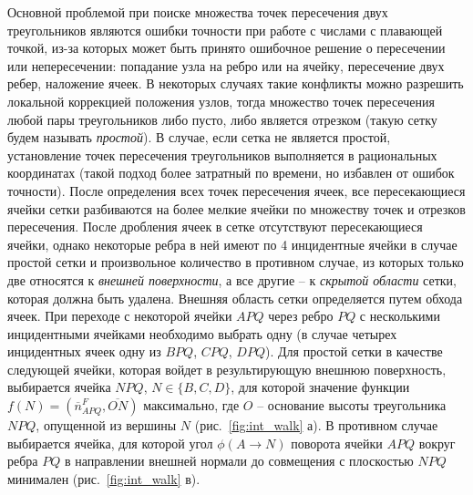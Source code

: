 \documentclass[a4paper,14pt]{extarticle}                     %
\theoremstyle{plain}                                         %
\begin{document}
Основной проблемой при поиске множества точек пересечения двух треугольников являются ошибки точности при работе с числами с плавающей точкой, из-за которых может быть принято ошибочное решение о пересечении или непересечении: попадание узла на ребро или на ячейку, пересечение двух ребер, наложение ячеек.
В некоторых случаях такие конфликты можно разрешить локальной коррекцией положения узлов, тогда множество точек пересечения любой пары треугольников либо пусто, либо является отрезком (такую сетку будем называть \textit{простой}).
В случае, если сетка не является простой, установление точек пересечения треугольников выполняется в рациональных координатах (такой подход более затратный по времени, но избавлен от ошибок точности).
После определения всех точек пересечения ячеек, все пересекающиеся ячейки сетки разбиваются на более мелкие ячейки по множеству точек и отрезков пересечения.
После дробления ячеек в сетке отсутствуют пересекающиеся ячейки, однако некоторые ребра в ней имеют по 4 инцидентные ячейки в случае простой сетки и произвольное количество в противном случае, из которых только две относятся к \textit{внешней поверхности}, а все другие -- к \textit{скрытой области} сетки, которая должна быть удалена.
Внешняя область сетки определяется путем обхода ячеек.
При переходе с некоторой ячейки $APQ$ через ребро $PQ$ с несколькими инцидентными ячейками необходимо выбрать одну (в случае четырех инцидентных ячеек одну из $BPQ$, $CPQ$, $DPQ$).
Для простой сетки в качестве следующей ячейки, которая войдет в результирующую внешнюю поверхность, выбирается ячейка $NPQ$, $N \in \{ B, C, D \}$, для которой значение функции $f(N) = (\overline{n}_{APQ}^F, \overline{ON})$ максимально, где $O$ -- основание высоты треугольника $NPQ$, опущенной из вершины $N$ (рис.~\ref{fig:int_walk} а).
В противном случае выбирается ячейка, для которой угол $\phi(A \rightarrow N)$ поворота ячейки $APQ$ вокруг ребра $PQ$ в направлении внешней нормали до совмещения с плоскостью $NPQ$ минимален (рис.~\ref{fig:int_walk} в).
\end{document}
